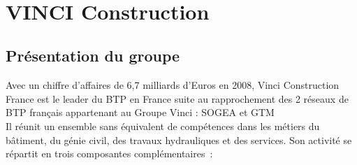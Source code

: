 \documentclass[a4paper]{article}
\begin{document}
\maketitle

\hfill\\
\section {VINCI Construction}

\subsection{Présentation du groupe}

Avec un chiffre d’affaires de 6,7 milliards d’Euros en 2008, Vinci Construction France est le leader du BTP en France suite au rapprochement des 2 réseaux de BTP français appartenant au Groupe Vinci : SOGEA et GTM \\

Il réunit un ensemble sans équivalent de compétences dans les métiers du bâtiment, du génie civil, des travaux hydrauliques et des services.
Son activité se répartit en trois composantes complémentaires : \\
\end{document}

